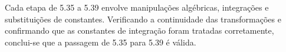Cada etapa de 5.35 a 5.39 envolve manipulações algébricas, integrações e substituições de constantes. Verificando a continuidade das transformações e confirmando que as constantes de integração foram tratadas corretamente, conclui-se que a passagem de 5.35 para 5.39 é válida. 